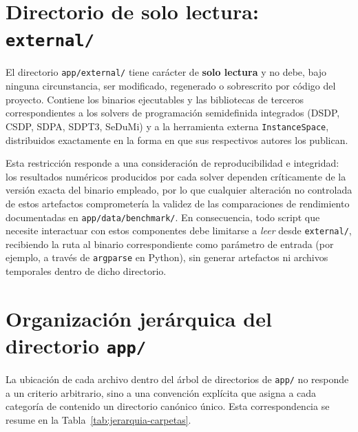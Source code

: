 \section{Directorio de solo lectura: \texttt{external/}}

El directorio \texttt{app/external/} tiene car\'acter de \textbf{solo
lectura} y no debe, bajo ninguna circunstancia, ser modificado, regenerado o
sobrescrito por c\'odigo del proyecto. Contiene los binarios ejecutables y
las bibliotecas de terceros correspondientes a los solvers de programaci\'on
semidefinida integrados (DSDP, CSDP, SDPA, SDPT3, SeDuMi) y a la herramienta
externa \texttt{InstanceSpace}, distribuidos exactamente en la forma en que
sus respectivos autores los publican.

Esta restricci\'on responde a una consideraci\'on de reproducibilidad e
integridad: los resultados num\'ericos producidos por cada solver dependen
cr\'iticamente de la versi\'on exacta del binario empleado, por lo que
cualquier alteraci\'on no controlada de estos artefactos comprometer\'ia la
validez de las comparaciones de rendimiento documentadas en
\texttt{app/data/benchmark/}. En consecuencia, todo script que necesite
interactuar con estos componentes debe limitarse a \emph{leer} desde
\texttt{external/}, recibiendo la ruta al binario correspondiente como
par\'ametro de entrada (por ejemplo, a trav\'es de \texttt{argparse} en
Python), sin generar artefactos ni archivos temporales dentro de dicho
directorio.

\section{Organizaci\'on jer\'arquica del directorio \texttt{app/}}

La ubicaci\'on de cada archivo dentro del \'arbol de directorios de
\texttt{app/} no responde a un criterio arbitrario, sino a una convenci\'on
expl\'icita que asigna a cada categor\'ia de contenido un directorio
can\'onico \'unico. Esta correspondencia se resume en la
Tabla~\ref{tab:jerarquia-carpetas}.


